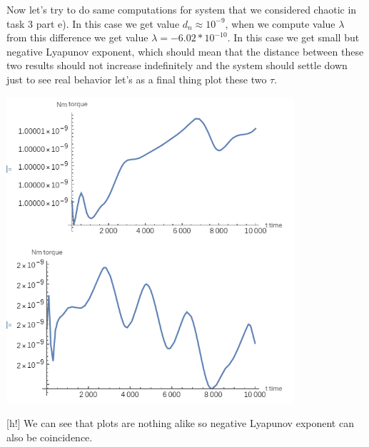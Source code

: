 \documentclass[a4paper]{article}
\begin{document}
	Now let's try to do same computations for system that we considered chaotic in task 3 part e).
	In this case we get value $d_n\approx10^{-9}$, when we compute value $\lambda$ from this difference we get value $\lambda=-6.02*10^{-10}$. In this case we get small but negative Lyapunov exponent, which should mean that the distance between these two results should not increase indefinitely and the system should settle down just to see real behavior let's as a final thing plot these two $\tau$.
	\\
	\centerline{\includegraphics[width=0.8\textwidth]{3_g_t}}[h!]
	We can see that plots are nothing alike so negative Lyapunov exponent can also be coincidence.
\end{document}
